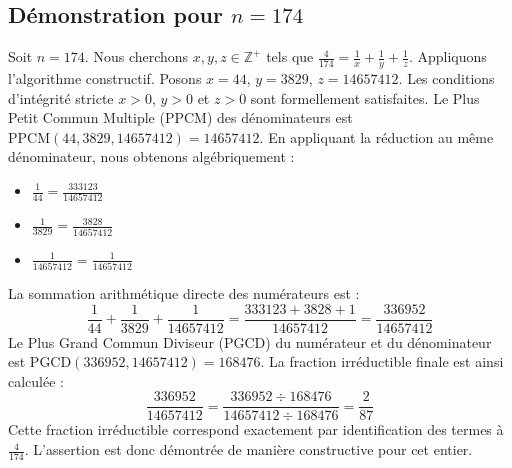 \documentclass[11pt,a4paper]{article}
\begin{document}
\subsection{Démonstration pour $n = 174$}
Soit $n = 174$. Nous cherchons $x, y, z \in \mathbb{Z}^{+}$ tels que $\frac{4}{174} = \frac{1}{x} + \frac{1}{y} + \frac{1}{z}$.
Appliquons l'algorithme constructif. Posons $x = 44$, $y = 3829$, $z = 14657412$.
Les conditions d'intégrité stricte $x > 0$, $y > 0$ et $z > 0$ sont formellement satisfaites.
Le Plus Petit Commun Multiple (PPCM) des dénominateurs est $\text{PPCM}(44, 3829, 14657412) = 14657412$.
En appliquant la réduction au même dénominateur, nous obtenons algébriquement :
\begin{itemize}
    \item $\frac{1}{44} = \frac{333123}{14657412}$
    \item $\frac{1}{3829} = \frac{3828}{14657412}$
    \item $\frac{1}{14657412} = \frac{1}{14657412}$
\end{itemize}
La sommation arithmétique directe des numérateurs est :
$$ \frac{1}{44} + \frac{1}{3829} + \frac{1}{14657412} = \frac{333123 + 3828 + 1}{14657412} = \frac{336952}{14657412} $$
Le Plus Grand Commun Diviseur (PGCD) du numérateur et du dénominateur est $\text{PGCD}(336952, 14657412) = 168476$.
La fraction irréductible finale est ainsi calculée :
$$ \frac{336952}{14657412} = \frac{336952 \div 168476}{14657412 \div 168476} = \frac{2}{87} $$
Cette fraction irréductible correspond exactement par identification des termes à $\frac{4}{174}$. L'assertion est donc démontrée de manière constructive pour cet entier.
\end{document}
